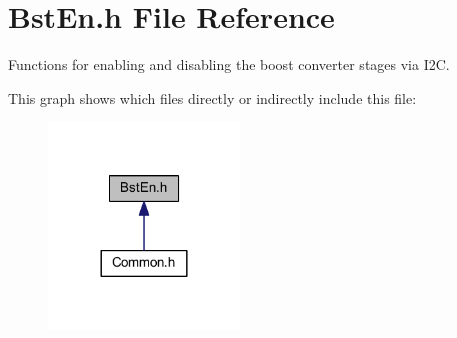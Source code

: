 \hypertarget{a00008}{\section{Bst\-En.\-h File Reference}
\label{a00008}
}


Functions for enabling and disabling the boost converter stages via I2\-C.  


This graph shows which files directly or indirectly include this file\-:\nopagebreak
\begin{figure}[H]
\begin{center}
\leavevmode
\includegraphics[width=144pt]{a00045}
\end{center}
\end{figure}
